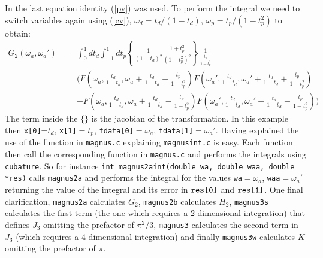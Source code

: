 \documentclass[10pt,letterpaper]{article}
\begin{document}
In the last equation identity (\ref{pv}) was used. To perform the integral we need to switch variables again using (\ref{cv}), $\omega_d=t_d/(1-t_d)$, $\omega_p=t_p/(1-t_p^2)$ to obtain:
\begin{eqnarray}
G_2(\omega_a,\omega_a') &=& \int_0^1 dt_d \int_{-1}^1 d t_p \left\{
\frac{1}{(1-t_d)^2} \frac{1+t_p^2}{(1-t_p^2)^2}  \right\} \frac{1}{\frac{t_p}{1-t_p^2}}\nonumber\\
&&\Big(
F\left(\omega_a,\frac{t_d}{1-t_d},\omega_a+\frac{t_d}{1-t_d}+\frac{t_p}{1-t_p^2}\right) F\left(\omega_a' ,\frac{t_d}{1-t_d},\omega_a' +\frac{t_d}{1-t_d}+\frac{t_p}{1-t_p^2}\right)\\
&&-F\left(\omega_a,\frac{t_d}{1-t_d},\omega_a+\frac{t_d}{1-t_d}-\frac{t_p}{1-t_p^2}\right) F\left(\omega_a' ,\frac{t_d}{1-t_d},\omega_a' +\frac{t_d}{1-t_d}-\frac{t_p}{1-t_p^2}\right)\Big)
\end{eqnarray}
The term inside the $\{ \}$ is the jacobian of the transformation. In this example then \verb|x[0]|=$t_d$, \verb|x[1]|$=t_p$, \verb|fdata[0]|$=\omega_a$, \verb|fdata[1]|$=\omega_a'$. Having explained the use of the function in \verb|magnus.c| explaining \verb|magnusint.c| is easy. Each function then call the corresponding function in \verb|magnus.c| and performs the integrals using \verb|cubature|. So for instance \verb|int magnus2aint(double wa, double waa, double *res)| calls \verb|magnus2a| and performs the integral for the values \verb|wa|$=\omega_a$, \verb|waa|$=\omega_a'$ returning the value of the integral and its error in $\verb|res[0]|$ and $\verb|res[1]|$.
One final clarification, \verb|magnus2a| calculates $G_2$, \verb|magnus2b| calculates $H_2$, \verb|magnus3s| calculates the first term (the one which requires a 2 dimensional integration) that defines $J_3$ omitting the prefactor of $\pi^2/3$, \verb|magnus3| calculates the second term in $J_3$ (which requires a 4 dimensional integration) and finally \verb|magnus3w| calculates $K$ omitting the prefactor of $\pi$.





\end{document}
